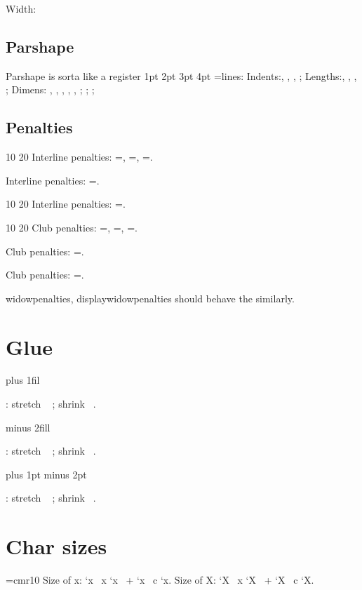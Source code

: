 \documentclass{article}
\begin{document}
\protected{}
\protected\def\protectedmyminus{-}
\protected{}
\protected{}
\mydima\protectedmyminus\protectedmyone\protectedmytwo\protectedmypts\relax
Width:\the\mydima

\subsection{Parshape}
Parshape is sorta like a register
\newcount\mynum
{} 1pt 2pt 3pt 4pt
\mynum=\parshape\relax \the\mynum lines:
Indents:\the{}\relax,
\the{}\relax,
\the{}\relax,
\the{}\relax;
Lengths:\the{}\relax,
\the{}\relax,
\the{}\relax,
\the{}\relax;
Dimens:
\the{}\relax,
\the{}\relax,
\the{}\relax,
\the{}\relax,
\the{}\relax,
\the{}\relax;
\the{}\relax;
\the{}\relax;

\subsection{Penalties}
 10 20
Interline penalties:
 \mynum=\relax \the\mynum,
 \mynum=\relax \the\mynum,
 \mynum=\relax \the\mynum.

Interline penalties:
 \mynum=\relax \the\mynum.

 10 20
Interline penalties:
 \mynum=\relax \the\mynum.

  10 20
Club penalties:
 \mynum=\relax \the\mynum,
 \mynum=\relax \the\mynum,
 \mynum=\relax \the\mynum.
 
 Club penalties:
 \mynum=\relax \the\mynum.

Club penalties:
 \mynum=\relax \the\mynum.

widowpenalties, displaywidowpenalties should behave the similarly.

\section{Glue}
\def\showskip#1{
  \the#1 : stretch \the\gluestretch#1\ \the\gluestretchorder#1 ;
 shrink \the\glueshrink#1\ \the\glueshrinkorder#1.}
\newskip\myskip

\myskip=10pt plus 1fil\relax
\showskip\myskip

\myskip=10pt minus 2fill\relax
\showskip\myskip

\myskip=10pt plus 1pt minus 2pt\relax
\showskip\myskip


\section{Char sizes}
\def\charsize#1#2{
  \the\fontcharwd#1 `#2
\ x \the\fontcharht#1 `#2
\ + \the\fontchardp#1 `#2
\ c \the\fontcharic#1 `#2}

\font\tenrm=cmr10
Size of x: \charsize\tenrm x.
Size of X: \charsize\tenrm X.
\end{document}
